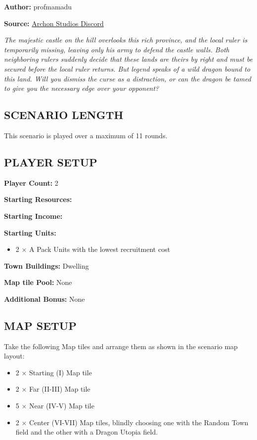 
\begin{multicols*}{2}

\textbf{Author:} profmamadu

\textbf{Source:} \href{https://discord.com/channels/740870068178649108/1253016693517717714/1253016693517717714}{Archon Studios Discord}

\textit{The majestic castle on the hill overlooks this rich province, and the local ruler is temporarily missing, leaving only his army to defend the castle walls.
Both neighboring rulers suddenly decide that these lands are theirs by right and must be secured before the local ruler returns.
But legend speaks of a wild dragon bound to this land.
Will you dismiss the curse as a distraction, or can the dragon be tamed to give you the necessary edge over your opponent?
}

\subsection*{\MakeUppercase{Scenario Length}}

This scenario is played over a maximum of 11 rounds.

\subsection*{\MakeUppercase{Player Setup}}

\textbf{Player Count:} 2

\textbf{Starting Resources:}\par
{}

\textbf{Starting Income:}\par
{}

\textbf{Starting Units:}
\begin{itemize}
  \item 2 × A Pack  Units with the lowest recruitment cost
\end{itemize}

\textbf{Town Buildings:}  Dwelling

\textbf{Map tile Pool:} None

\textbf{Additional Bonus:} None

\subsection*{\MakeUppercase{Map Setup}}
Take the following Map tiles and arrange them as shown in the scenario map layout:
\begin{itemize}
  \item 2 × Starting (I) Map tile
  \item 2 × Far (II-III) Map tile
  \item 5 × Near (IV-V) Map tile
  \item 2 × Center (VI-VII) Map tiles, blindly choosing one with the Random Town field and the other with a Dragon Utopia field.
\end{itemize}


\end{multicols*}
